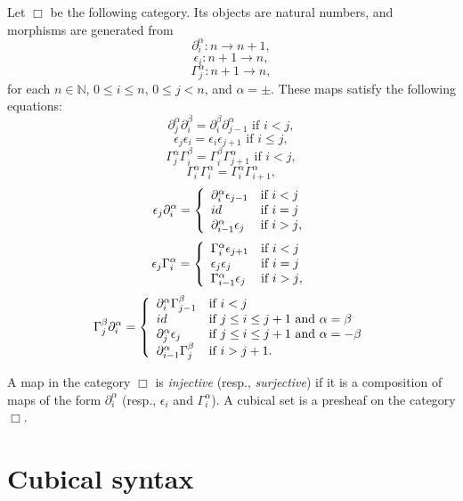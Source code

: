 \documentclass{amsart}
\theoremstyle{definition}
\theoremstyle{remark}
\newcommand{\nats}{\mathbb{N}}
\numberwithin{table}{section}
\begin{document}
Let $\Box$ be the following category. Its objects are natural numbers, and morphisms are generated from
\[ \partial^\alpha_i : n \to n + 1, \]
\[ \epsilon_i : n + 1 \to n, \]
\[ \Gamma^\alpha_j : n + 1 \to n, \]
for each $n \in \nats$, $0 \leq i \leq n$, $0 \leq j < n$, and $\alpha = \pm$.
These maps satisfy the following equations:
\[ \partial^\alpha_j \partial^\beta_i = \partial^\beta_i \partial^\alpha_{j-1} \text{ if $i < j$}, \]
\[ \epsilon_j \epsilon_i = \epsilon_i \epsilon_{j+1} \text{ if $i \leq j$}, \]
\[ \Gamma^\alpha_j \Gamma^\beta_i = \Gamma^\beta_i \Gamma^\alpha_{j+1} \text{ if $i < j$}, \]
\[ \Gamma^\alpha_i \Gamma^\alpha_i = \Gamma^\alpha_i \Gamma^\alpha_{i+1}, \]
\[ \epsilon_j \partial^\alpha_i = \left\{ \begin{array}{l l}
            \partial^\alpha_i \epsilon_{j-1} & \text{if $i < j$} \\
            id                               & \text{if $i = j$} \\
            \partial^\alpha_{i-1} \epsilon_j & \text{if $i > j$},
    \end{array} \right. \]
\[ \epsilon_j \Gamma^\alpha_i = \left\{ \begin{array}{l l}
            \Gamma^\alpha_i \epsilon_{j+1} & \text{if $i < j$} \\
            \epsilon_j \epsilon_j         & \text{if $i = j$} \\
            \Gamma^\alpha_{i-1} \epsilon_j & \text{if $i > j$},
    \end{array} \right. \]
\[ \Gamma^\beta_j \partial^\alpha_i = \left\{ \begin{array}{l l}
            \partial^\alpha_i \Gamma^\beta_{j-1} & \text{if $i < j$} \\
            id                                   & \text{if $j \leq i \leq j + 1$ and $\alpha = \beta$} \\
            \partial^\alpha_j \epsilon_j         & \text{if $j \leq i \leq j + 1$ and $\alpha = -\beta$} \\
            \partial^\alpha_{i-1} \Gamma^\beta_j & \text{if $i > j + 1$}.
    \end{array} \right. \]

A map in the category $\Box$ is \emph{injective} (resp., \emph{surjective}) if it is a composition of maps of the form $\partial^\alpha_i$ (resp., $\epsilon_i$ and $\Gamma^\alpha_i$).
A cubical set is a presheaf on the category $\Box$.

\section{Cubical syntax}
\end{document}
